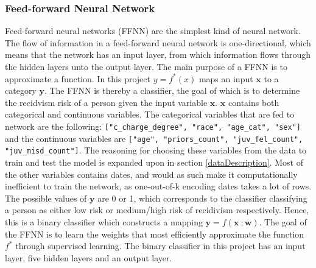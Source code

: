 \documentclass[11pt, fleqn, titlepage]{article}
\begin{document}
	\subsubsection{Feed-forward Neural Network}
	Feed-forward neural networks (FFNN) are the simplest kind of neural network. The flow of information in a feed-forward neural network is one-directional, which means that the network has an input layer, from which information flows through the hidden layers unto the output layer. The main purpose of a FFNN is to approximate a function. In this project $ y = f^*(x) $ maps an input $ \mathbf x $ to a category $ \mathbf y $. The FFNN is thereby a classifier, the goal of which is to determine the recidvism risk of a person given the input variable $ \mathbf x $. $ \mathbf x $ contains both categorical and continuous variables. The categorical variables that are fed to network are the following: \texttt{["c\_charge\_degree", "race", "age\_cat", "sex"]} and the continuous variables are \texttt{["age", "priors\_count", "juv\_fel\_count", "juv\_misd\_count"]}. The reasoning for choosing these variables from the data to train and test the model is expanded upon in section \ref{dataDescription}. Most of the other variables contains dates, and would as such make it computationally inefficient to train the network, as one-out-of-k encoding dates takes a lot of rows. The possible values of $ \mathbf y $ are 0 or 1, which corresponds to the classifier classifying a person as either low risk or medium/high risk of recidivism respectively. Hence, this is a binary classifier which constructs a mapping $ \mathbf y = f(\mathbf x \ ; \mathbf w) $. The goal of the FFNN is to learn the weights that most efficiently approximate the function $ f^* $ through supervised learning. The binary classifier in this project has an input layer, five hidden layers and an output layer. \cite{dl}
	
\end{document}
